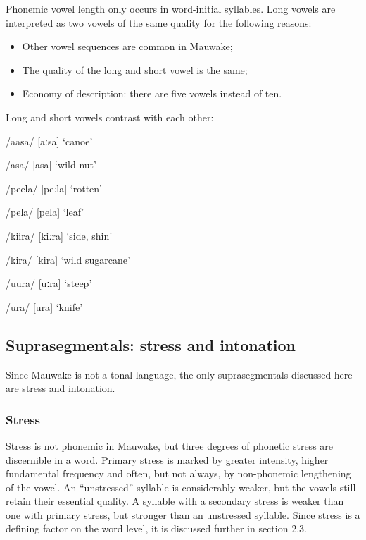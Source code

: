 Phonemic vowel length only occurs in word-initial syllables.  Long vowels are interpreted as two vowels of the same quality for the following reasons:


\begin{itemize}
\item Other vowel sequences are common in Mauwake;

\item The quality of the long and short vowel is the same;

\item Economy of description: there are five vowels instead of ten.


\end{itemize}
Long and short vowels contrast with each other:

/aasa/  [{{\textprimstress}aːsa}]  `canoe'

/asa/  [a{{\textprimstress}sa}]  `wild  nut'

/peela/  [{{\textprimstress}peːla}]  `rotten'

/pela/  [pe{{\textprimstress}la}]  `leaf'

/kiira/  [{{\textprimstress}kiːr}a]  `side, shin'

/kira/  [ki{{\textprimstress}ra}]  `wild sugarcane'

/{\textphi}uura/  [{{\textprimstress}}{\textphi}uːra]  `steep'

/{\textphi}ura/  [{\textphi}u{{\textprimstress}ra}]  `knife'

\subsection{Suprasegmentals: stress and intonation}


Since Mauwake is not a tonal language, the only suprasegmentals discussed here are stress and intonation.

\subsubsection{Stress}


Stress is not phonemic in Mauwake, but three degrees of phonetic stress are discernible in a word.  Primary stress is marked by greater intensity, higher fundamental frequency and often, but not always, by non-phonemic lengthening of the vowel.  An ``unstressed'' syllable is considerably weaker, but the vowels still retain their essential quality.  A syllable with a secondary stress is weaker than one with primary stress, but stronger than an unstressed syllable. Since stress is a defining factor on the word level, it is discussed further in section 2.3.

